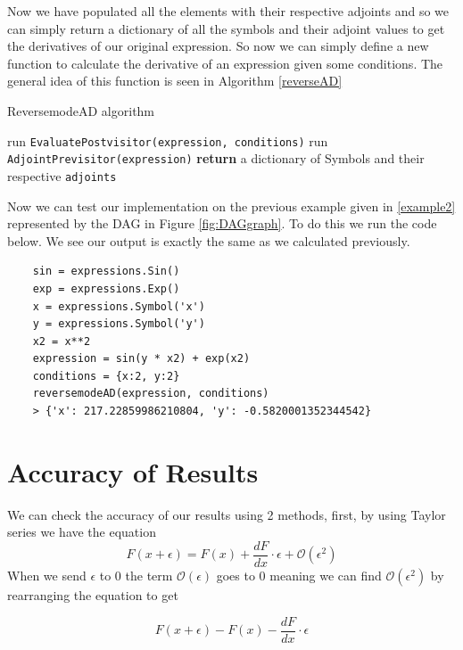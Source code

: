 \documentclass{article}
\begin{document}
Now we have populated all the elements with their respective adjoints and so we can simply return a dictionary of all the symbols and their adjoint values to get the derivatives of our original expression. So now we can simply define a new function to calculate the derivative of an expression given some conditions. The general idea of this function is seen in Algorithm \ref{reverseAD}

\begin{algorithm}[h]
\caption{ReversemodeAD algorithm}\label{reverseAD}
\begin{algorithmic}[1]
\State run \verb|EvaluatePostvisitor(expression, conditions)|
\State run \verb|AdjointPrevisitor(expression)|
\State \textbf{return} a dictionary of Symbols and their respective \verb|adjoints|
\EndProcedure
\end{algorithmic}
\end{algorithm}

Now we can test our implementation on the previous example given in \eqref{example2} represented by the DAG in Figure \ref{fig:DAGgraph}. To do this we run the code below. We see our output is exactly the same as we calculated previously.

\begin{verbatim}
    sin = expressions.Sin()
    exp = expressions.Exp()
    x = expressions.Symbol('x')
    y = expressions.Symbol('y')
    x2 = x**2
    expression = sin(y * x2) + exp(x2)
    conditions = {x:2, y:2}
    reversemodeAD(expression, conditions)
    > {'x': 217.22859986210804, 'y': -0.5820001352344542}
\end{verbatim}



\section{Accuracy of Results}

We can check the accuracy of our results using 2 methods, first, by using Taylor series we have the equation
\begin{equation}
    F(x + \epsilon) = F(x) + \frac{dF}{dx} \cdot \epsilon + \mathcal{O}(\epsilon ^ 2)
\end{equation}
When we send $\epsilon$ to 0 the term $\mathcal{O}(\epsilon)$ goes to 0 meaning we can find $\mathcal{O}(\epsilon^2)$ by rearranging the equation to get

\begin{equation}
    F(x + \epsilon) - F(x) - \frac{dF}{dx} \cdot \epsilon
\end{equation}
\end{document}
